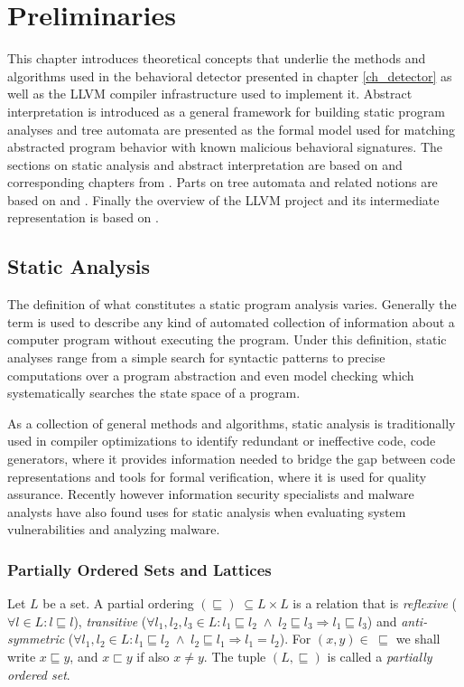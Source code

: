 \chapter{Preliminaries}
\label{ch_prelim}
This chapter introduces theoretical concepts that underlie the methods and algorithms used in the behavioral detector presented in chapter \ref{ch_detector} as well as the \textsc{LLVM} compiler infrastructure used to implement it. Abstract interpretation is introduced as a general framework for building static program analyses and tree automata are presented as the formal model used for matching abstracted program behavior with known malicious behavioral signatures. The sections on static analysis and abstract interpretation are based on \cite{FAV_Slides16} and corresponding chapters from \cite{Nielson05}. Parts on tree automata and related notions are based on \cite{tata07} and \cite{Babic11}. Finally the overview of the \textsc{LLVM} project and its intermediate representation is based on \cite{LLVM14}.

\section{Static Analysis}
The definition of what constitutes a static program analysis varies. Generally the term is used to describe any kind of automated collection of information about a computer program without executing the program. Under this definition, static analyses range from a simple search for syntactic patterns to precise computations over a program abstraction and even model checking which systematically searches the state space of a program.

As a collection of general methods and algorithms, static analysis is traditionally used in compiler optimizations to identify redundant or ineffective code, code generators, where it provides information needed to bridge the gap between code representations and tools for formal verification, where it is used for quality assurance. Recently however information security specialists and malware analysts have also found uses for static analysis when evaluating system vulnerabilities and analyzing malware.

\subsection{Partially Ordered Sets and Lattices}
\begin{defn}
Let $L$ be a set. A partial ordering $(\sqsubseteq) \; \subseteq L \times L$ is a relation that is \emph{reflexive} ($\forall l \in L: l \sqsubseteq l$), \emph{transitive} ($\forall l_1, l_2, l_3 \in L: l_1 \sqsubseteq l_2 \; \wedge \; l_2 \sqsubseteq l_3 \Rightarrow l_1 \sqsubseteq l_3$) and \emph{anti-symmetric} ($\forall l_1, l_2 \in L: l_1 \sqsubseteq l_2 \; \wedge \; l_2 \sqsubseteq l_1 \Rightarrow l_1 = l_2$). For $(x,y) \in \; \sqsubseteq$ we shall write $x \sqsubseteq y$, and $x \sqsubset y$ if also $x \neq y$. The tuple $(L, \sqsubseteq)$ is called a \emph{partially ordered set}.
\end{defn}

